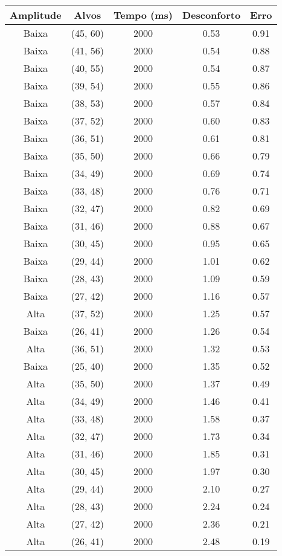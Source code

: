 \begin{tabular}{c c c c c}
\hline
Amplitude & Alvos & Tempo (ms) & Desconforto & Erro \\
\hline
Baixa & (45, 60) &  2000 & 0.53 & 0.91 \\
Baixa & (41, 56) &  2000 & 0.54 & 0.88 \\
Baixa & (40, 55) &  2000 & 0.54 & 0.87 \\
Baixa & (39, 54) &  2000 & 0.55 & 0.86 \\
Baixa & (38, 53) &  2000 & 0.57 & 0.84 \\
Baixa & (37, 52) &  2000 & 0.60 & 0.83 \\
Baixa & (36, 51) &  2000 & 0.61 & 0.81 \\
Baixa & (35, 50) &  2000 & 0.66 & 0.79 \\
Baixa & (34, 49) &  2000 & 0.69 & 0.74 \\
Baixa & (33, 48) &  2000 & 0.76 & 0.71 \\
Baixa & (32, 47) &  2000 & 0.82 & 0.69 \\
Baixa & (31, 46) &  2000 & 0.88 & 0.67 \\
Baixa & (30, 45) &  2000 & 0.95 & 0.65 \\
Baixa & (29, 44) &  2000 & 1.01 & 0.62 \\
Baixa & (28, 43) &  2000 & 1.09 & 0.59 \\
Baixa & (27, 42) &  2000 & 1.16 & 0.57 \\
Alta & (37, 52) &  2000 & 1.25 & 0.57 \\
Baixa & (26, 41) &  2000 & 1.26 & 0.54 \\
Alta & (36, 51) &  2000 & 1.32 & 0.53 \\
Baixa & (25, 40) &  2000 & 1.35 & 0.52 \\
Alta & (35, 50) &  2000 & 1.37 & 0.49 \\
Alta & (34, 49) &  2000 & 1.46 & 0.41 \\
Alta & (33, 48) &  2000 & 1.58 & 0.37 \\
Alta & (32, 47) &  2000 & 1.73 & 0.34 \\
Alta & (31, 46) &  2000 & 1.85 & 0.31 \\
Alta & (30, 45) &  2000 & 1.97 & 0.30 \\
Alta & (29, 44) &  2000 & 2.10 & 0.27 \\
Alta & (28, 43) &  2000 & 2.24 & 0.24 \\
Alta & (27, 42) &  2000 & 2.36 & 0.21 \\
Alta & (26, 41) &  2000 & 2.48 & 0.19 \\

\end{tabular}
